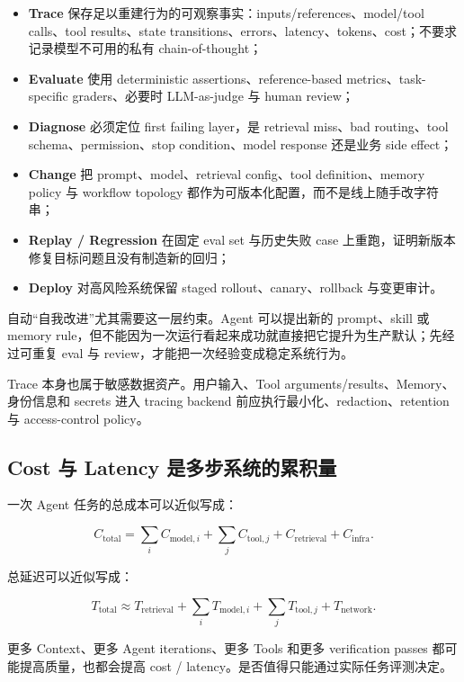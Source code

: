 \documentclass[profile=standard,twoside=false]{ipara-handbook}
\begin{document}
\begin{itemize}
  \item \textbf{Trace} 保存足以重建行为的可观察事实：inputs/references、model/tool calls、tool results、state transitions、errors、latency、tokens、cost；不要求记录模型不可用的私有 chain-of-thought；
  \item \textbf{Evaluate} 使用 deterministic assertions、reference-based metrics、task-specific graders、必要时 LLM-as-judge 与 human review；
  \item \textbf{Diagnose} 必须定位 first failing layer，是 retrieval miss、bad routing、tool schema、permission、stop condition、model response 还是业务 side effect；
  \item \textbf{Change} 把 prompt、model、retrieval config、tool definition、memory policy 与 workflow topology 都作为可版本化配置，而不是线上随手改字符串；
  \item \textbf{Replay / Regression} 在固定 eval set 与历史失败 case 上重跑，证明新版本修复目标问题且没有制造新的回归；
  \item \textbf{Deploy} 对高风险系统保留 staged rollout、canary、rollback 与变更审计。
\end{itemize}

自动“自我改进”尤其需要这一层约束。Agent 可以提出新的 prompt、skill 或 memory rule，但不能因为一次运行看起来成功就直接把它提升为生产默认；先经过可重复 eval 与 review，才能把一次经验变成稳定系统行为。

Trace 本身也属于敏感数据资产。用户输入、Tool arguments/results、Memory、身份信息和 secrets 进入 tracing backend 前应执行最小化、redaction、retention 与 access-control policy。

\subsection{Cost 与 Latency 是多步系统的累积量}

一次 Agent 任务的总成本可以近似写成：

$$
C_{\text{total}}
=\sum_i C_{\text{model},i}
+\sum_j C_{\text{tool},j}
+C_{\text{retrieval}}
+C_{\text{infra}}.
$$

总延迟可以近似写成：

$$
T_{\text{total}}
\approx T_{\text{retrieval}}
+\sum_i T_{\text{model},i}
+\sum_j T_{\text{tool},j}
+T_{\text{network}}.
$$

更多 Context、更多 Agent iterations、更多 Tools 和更多 verification passes 都可能提高质量，也都会提高 cost / latency。是否值得只能通过实际任务评测决定。
\end{document}
